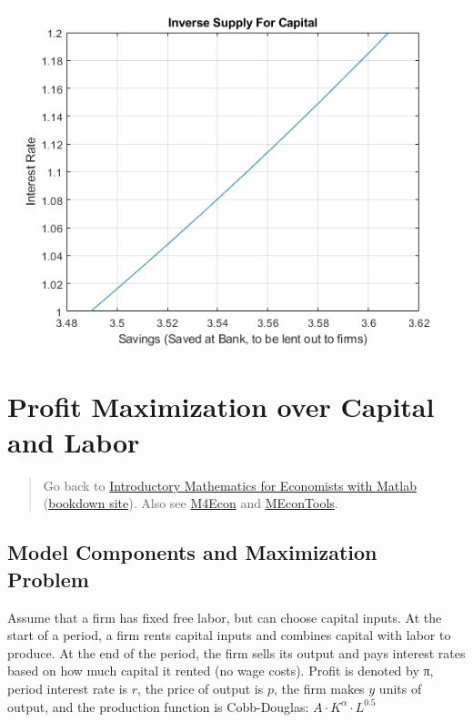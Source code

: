 \documentclass[
]{book}
\begin{document}
\includegraphics[width=5.20833in,height=\textheight]{img/K_save_households_images/figure_1.png}

\hypertarget{profit-maximization-over-capital-and-labor}{%
\section{Profit Maximization over Capital and Labor}\label{profit-maximization-over-capital-and-labor}}

\begin{quote}
Go back to \href{https://math4econ.github.io/}{Introductory Mathematics for Economists with Matlab} (\href{https://math4econ.github.io/bookdown}{bookdown site}). Also see \href{http://fanwangecon.github.io/M4Econ}{M4Econ} and \href{https://fanwangecon.github.io/MEconTools/}{MEconTools}.
\end{quote}

\hypertarget{model-components-and-maximization-problem-1}{%
\subsection{Model Components and Maximization Problem}\label{model-components-and-maximization-problem-1}}

Assume that a firm has fixed free labor, but can choose capital inputs.
At the start of a period, a firm rents capital inputs and combines
capital with labor to produce. At the end of the period, the firm sells
its output and pays interest rates based on how much capital it rented
(no wage costs). Profit is denoted by π, period interest rate is \(r\),
the price of output is \(p\), the firm makes \(y\) units of output, and the
production function is Cobb-Douglas: \(A\cdot K^{\alpha } \cdot L^{0.5}\)
\end{document}
